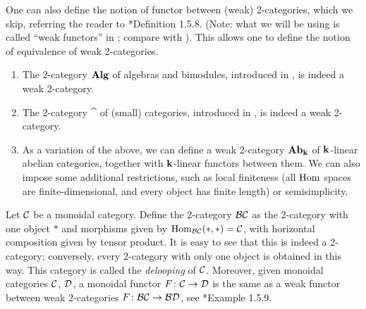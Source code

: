 One can also define the notion of functor between (weak) 2-categories, which we
skip, referring the reader to *{Definition 1.5.8}. (Note: what
we will be using is called ``weak functors'' in ; compare with
). This allows one to define the notion of equivalence
of weak 2-categories.


\begin{example}\label{x:weak-2cat-examples}\par\noindent
  \begin{enumerate}
    \item The 2-category $\mathbf{Alg}$ of algebras and bimodules,
      introduced in , is
      indeed a weak 2-category.
    \item The 2-category $\cat$ of (small) categories,
      introduced in , is indeed a weak 2-category.
    \item As a variation of the above, we can define a weak 2-category $\mathbf{Ab}_{\mathbf{k}}$
      of $\mathbf{k}$-linear abelian categories, together with $\mathbf{k}$-linear functors
      between them. We can also impose some additional restrictions, such as
      local finiteness (all $\operatorname{Hom}$ spaces are finite-dimensional, and every
      object has finite length) or semisimplicity.
  \end{enumerate}
\end{example}
\begin{example}\label{x:BC}
  Let $\mathcal{C}$ be a monoidal category. Define the 2-category $\mathcal{B}\mathcal{C}$ as the
  2-category with one object $*$ and morphisms given by $\operatorname{Hom}_{\mathcal{B}\mathcal{C}}(*,*)
  =\mathcal{C}$, with horizontal composition given by tensor product. It is easy to
  see that this is indeed a 2-category; conversely, every 2-category with only
  one object is obtained in this way. This category is called the
  \emph{delooping} of $\mathcal{C}$. Moreover, given monoidal
  categories $\mathcal{C}$, $\mathcal{D}$, a monoidal functor $F\colon \mathcal{C}\to\mathcal{D}$ is the
  same as a weak functor between weak 2-categories $F\colon \mathcal{B}\mathcal{C}\to
  \mathcal{B}\mathcal{D}$, see *{Example 1.5.9}.
\end{example}

